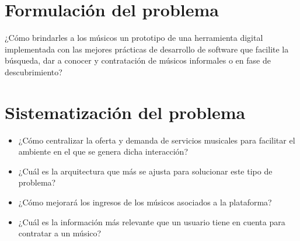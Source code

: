 \section{Formulación del problema}
¿Cómo brindarles a los músicos  un prototipo de una herramienta digital implementada con las mejores prácticas de desarrollo de software  que facilite la búsqueda, dar a conocer y contratación de músicos informales o en fase de descubrimiento?

\section{Sistematización del problema}

\begin{itemize}
  \item ¿Cómo centralizar la oferta y demanda de servicios musicales para facilitar el ambiente en el que se genera dicha interacción?
  \item ¿Cuál es la arquitectura que más se ajusta para solucionar este tipo de problema?
  \item ¿Cómo mejorará los ingresos de los músicos asociados a la plataforma?
  \item ¿Cuál es la información más relevante que un usuario tiene en cuenta para contratar a un músico?
\end{itemize}





